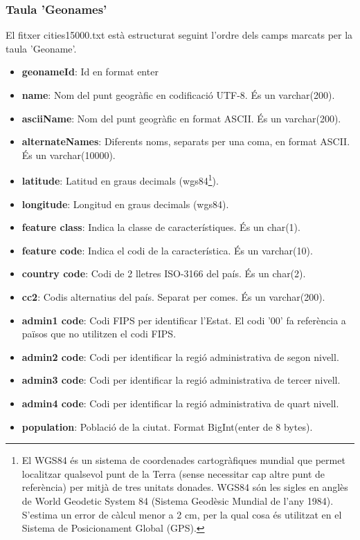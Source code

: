 \documentclass[12pt,a4paper,openright,oneside]{article}
\numberwithin{equation}{section}
\theoremstyle{definition}
\begin{document}
\subsubsection*{Taula 'Geonames'}
El fitxer cities15000.txt està estructurat seguint l'ordre dels camps marcats per la taula 'Geoname'.\cite{geonames}\\
\begin{itemize}
\item \textbf{geonameId}: Id en format enter
\item \textbf{name}: Nom del punt geogràfic en codificació UTF-8. És un varchar(200).
\item \textbf{asciiName}: Nom del punt geogràfic en format ASCII. És un varchar(200).
\item \textbf{alternateNames}: Diferents noms, separats per una coma, en format ASCII. És un varchar(10000).
\item \textbf{latitude}: Latitud en graus decimals (wgs84\footnote{El WGS84 és un sistema de coordenades cartogràfiques mundial que permet localitzar qualsevol punt de la Terra (sense necessitar cap altre punt de referència) per mitjà de tres unitats donades. WGS84 són les sigles en anglès de World Geodetic System 84 (Sistema Geodèsic Mundial de l'any 1984). S'estima un error de càlcul menor a 2 cm, per la qual cosa és utilitzat en el Sistema de Posicionament Global (GPS).}).
\item \textbf{longitude}: Longitud en graus decimals (wgs84).
\item \textbf{feature class}: Indica la classe de característiques. És un char(1).
\item \textbf{feature code}: Indica el codi de la característica. És un varchar(10).
\item \textbf{country code}: Codi de 2 lletres ISO-3166 del país. És un char(2).
\item \textbf{cc2}: Codis alternatius del país. Separat per comes. És un varchar(200).
\item \textbf{admin1 code}: Codi FIPS per identificar l'Estat. El codi '00' fa referència a països que no utilitzen el codi FIPS.
\item \textbf{admin2 code}: Codi per identificar la regió administrativa de segon nivell.
\item \textbf{admin3 code}: Codi per identificar la regió administrativa de tercer nivell.
\item \textbf{admin4 code}: Codi per identificar la regió administrativa de quart nivell.
\item \textbf{population}: Població de la ciutat. Format BigInt(enter de 8 bytes).

\end{itemize}
\end{document}

